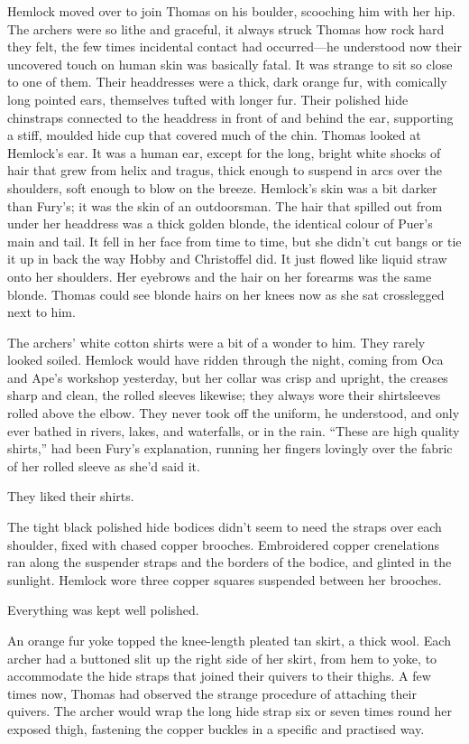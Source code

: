 \documentclass[11pt,a5paper]{article}
\begin{document}
Hemlock moved over to join Thomas on his boulder, scooching him with her hip. The archers were so lithe and graceful, it always struck Thomas how rock hard they felt, the few times incidental contact had occurred---he understood now their uncovered touch on human skin was basically fatal. It was strange to sit so close to one of them. Their headdresses were a thick, dark orange fur, with comically long pointed ears, themselves tufted with longer fur. Their polished hide chinstraps connected to the headdress in front of and behind the ear, supporting a stiff, moulded hide cup that covered much of the chin. Thomas looked at Hemlock's ear. It was a human ear, except for the long, bright white shocks of hair that grew from helix and tragus, thick enough to suspend in arcs over the shoulders, soft enough to blow on the breeze. Hemlock's skin was a bit darker than Fury's; it was the skin of an outdoorsman. The hair that spilled out from under her headdress was a thick golden blonde, the identical colour of Puer's main and tail. It fell in her face from time to time, but she didn't cut bangs or tie it up in back the way Hobby and Christoffel did. It just flowed like liquid straw onto her shoulders. Her eyebrows and the hair on her forearms was the same blonde. Thomas could see blonde hairs on her knees now as she sat crosslegged next to him.

The archers' white cotton shirts were a bit of a wonder to him. They rarely looked soiled. Hemlock would have ridden through the night, coming from Oca and Ape's workshop yesterday, but her collar was crisp and upright, the creases sharp and clean, the rolled sleeves likewise; they always wore their shirtsleeves rolled above the elbow. They never took off the uniform, he understood, and only ever bathed in rivers, lakes, and waterfalls, or in the rain. ``These are high quality shirts,'' had been Fury's explanation, running her fingers lovingly over the fabric of her rolled sleeve as she'd said it.

They liked their shirts.

The tight black polished hide bodices didn't seem to need the straps over each shoulder, fixed with chased copper brooches. Embroidered copper crenelations ran along the suspender straps and the borders of the bodice, and glinted in the sunlight. Hemlock wore three copper squares suspended between her brooches.

Everything was kept well polished.

An orange fur yoke topped the knee-length pleated tan skirt, a thick wool. Each archer had a buttoned slit up the right side of her skirt, from hem to yoke, to accommodate the hide straps that joined their quivers to their thighs. A few times now, Thomas had observed the strange procedure of attaching their quivers. The archer would wrap the long hide strap six or seven times round her exposed thigh, fastening the copper buckles in a specific and practised way.
\end{document}
